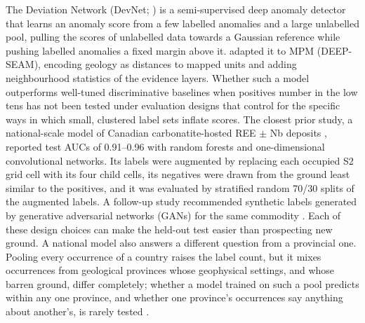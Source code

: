 \documentclass[pdflatex,sn-apa]{sn-jnl}
\begin{document}
The Deviation Network (DevNet; \citealp{Pang2019}) is a semi-supervised deep anomaly detector that learns an anomaly score from a few labelled anomalies and a large unlabelled pool, pulling the scores of unlabelled data towards a Gaussian reference while pushing labelled anomalies a fixed margin above it. \citet{Luo2026} adapted it to MPM (DEEP-SEAM), encoding geology as distances to mapped units and adding neighbourhood statistics of the evidence layers. Whether such a model outperforms well-tuned discriminative baselines when positives number in the low tens has not been tested under evaluation designs that control for the specific ways in which small, clustered label sets inflate scores. The closest prior study, a national-scale model of Canadian carbonatite-hosted REE $\pm$ Nb deposits \citep{Parsa2024}, reported test AUCs of 0.91--0.96 with random forests and one-dimensional convolutional networks. Its labels were augmented by replacing each occupied S2 grid cell with its four child cells, its negatives were drawn from the ground least similar to the positives, and it was evaluated by stratified random 70/30 splits of the augmented labels. A follow-up study recommended synthetic labels generated by generative adversarial networks (GANs) for the same commodity \citep{Parsa2025}. Each of these design choices can make the held-out test easier than prospecting new ground. A national model also answers a different question from a provincial one. Pooling every occurrence of a country raises the label count, but it mixes occurrences from geological provinces whose geophysical settings, and whose barren ground, differ completely; whether a model trained on such a pool predicts within any one province, and whether one province's occurrences say anything about another's, is rarely tested \citep{Ploton2020,Meyer2021}.
\end{document}

